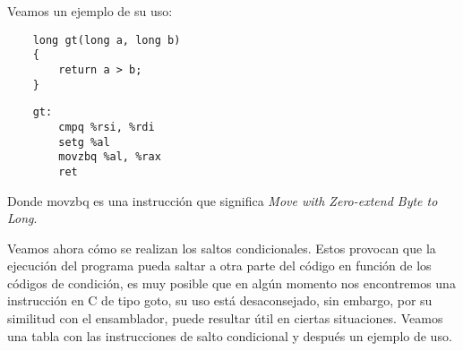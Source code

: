 \begin{ejemplo}
	Veamos un ejemplo de su uso:
	\begin{center}
		\begin{minipage}{0.39\textwidth}
			\begin{verbatim}
    long gt(long a, long b)
    {
        return a > b;
    }
            \end{verbatim}
		\end{minipage}
		\begin{minipage}{0.6\textwidth}
			\begin{verbatim}
    gt:
        cmpq %rsi, %rdi
        setg %al
        movzbq %al, %rax
        ret

            \end{verbatim}
		\end{minipage}
	\end{center}
	Donde movzbq es una instrucción que significa \textit{ Move with Zero-extend Byte to Long}.
\end{ejemplo}

Veamos ahora cómo se realizan los saltos condicionales.
Estos provocan que la ejecución del programa pueda saltar a otra parte del código en función de los códigos de condición, es muy posible que
en algún momento nos encontremos una instrucción en C de tipo goto, su uso está desaconsejado, sin embargo, por su similitud con el ensamblador,
puede resultar útil en ciertas situaciones. Veamos una tabla con las instrucciones de salto condicional y después un ejemplo de uso.

